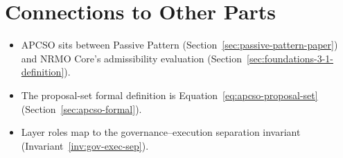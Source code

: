 \section*{Connections to Other Parts}

\begin{itemize}
\item APCSO sits between Passive Pattern (Section~\ref{sec:passive-pattern-paper})
and NRMO Core's admissibility evaluation
(Section~\ref{sec:foundations-3-1-definition}).
\item The proposal-set formal definition is Equation~\ref{eq:apcso-proposal-set}
(Section~\ref{sec:apcso-formal}).
\item Layer roles map to the governance--execution separation
invariant (Invariant~\ref{inv:gov-exec-sep}).
\end{itemize}
